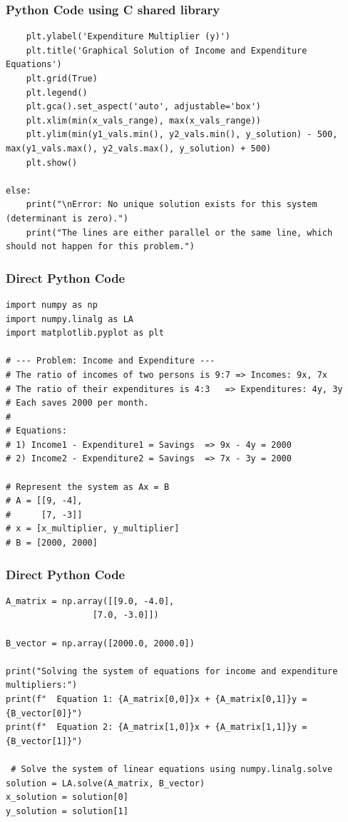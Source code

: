 \documentclass{beamer}
\begin{document}
\begin{frame}[fragile]
\frametitle{Python Code using C shared library}
\begin{lstlisting}
    plt.ylabel('Expenditure Multiplier (y)')
    plt.title('Graphical Solution of Income and Expenditure Equations')
    plt.grid(True)
    plt.legend()
    plt.gca().set_aspect('auto', adjustable='box')
    plt.xlim(min(x_vals_range), max(x_vals_range))
    plt.ylim(min(y1_vals.min(), y2_vals.min(), y_solution) - 500, max(y1_vals.max(), y2_vals.max(), y_solution) + 500)
    plt.show()

else:
    print("\nError: No unique solution exists for this system (determinant is zero).")
    print("The lines are either parallel or the same line, which should not happen for this problem.")
\end{lstlisting}
\end{frame}

\begin{frame}[fragile]
\frametitle{Direct Python Code }
\begin{lstlisting}
import numpy as np
import numpy.linalg as LA
import matplotlib.pyplot as plt

# --- Problem: Income and Expenditure ---
# The ratio of incomes of two persons is 9:7 => Incomes: 9x, 7x
# The ratio of their expenditures is 4:3   => Expenditures: 4y, 3y
# Each saves 2000 per month.
#
# Equations:
# 1) Income1 - Expenditure1 = Savings  => 9x - 4y = 2000
# 2) Income2 - Expenditure2 = Savings  => 7x - 3y = 2000

# Represent the system as Ax = B
# A = [[9, -4],
#      [7, -3]]
# x = [x_multiplier, y_multiplier]
# B = [2000, 2000]
\end{lstlisting}
\end{frame}

\begin{frame}[fragile]
\frametitle{Direct Python Code }
\begin{lstlisting}
A_matrix = np.array([[9.0, -4.0],
                 [7.0, -3.0]])

B_vector = np.array([2000.0, 2000.0])

print("Solving the system of equations for income and expenditure multipliers:")
print(f"  Equation 1: {A_matrix[0,0]}x + {A_matrix[0,1]}y = {B_vector[0]}")
print(f"  Equation 2: {A_matrix[1,0]}x + {A_matrix[1,1]}y = {B_vector[1]}")

 # Solve the system of linear equations using numpy.linalg.solve
solution = LA.solve(A_matrix, B_vector)
x_solution = solution[0]
y_solution = solution[1]
\end{lstlisting}
\end{frame}
\end{document}
